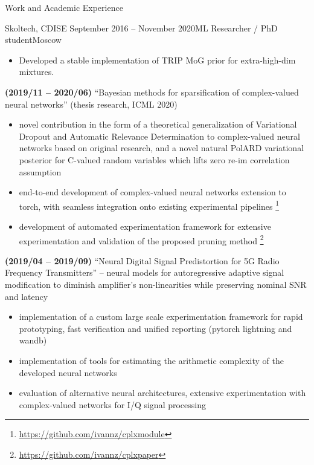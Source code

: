 \documentclass{resume} %
\begin{document}
\begin{rSection}{Work and Academic Experience}
\begin{rSubsection}{
        Skoltech, CDISE
    }{September 2016 -- November 2020}{ML Researcher / PhD student}{Moscow}
\begin{itemize}
        \item Developed a stable implementation of TRIP MoG prior for extra-high-dim mixtures.
    \end{itemize}

    \item \textbf{(2019/11 -- 2020/06)}
    ``Bayesian methods for sparsification of complex-valued neural networks'' (thesis research, ICML 2020)
    \begin{itemize}
        \item novel contribution in the form of a theoretical generalization of Variational Dropout and Automatic Relevance Determination to complex-valued neural networks based on original research, and a novel natural PolARD variational posterior for C-valued random variables which lifts zero re-im correlation assumption

        \item end-to-end development of complex-valued neural networks extension to torch, with seamless integration onto existing experimental pipelines%
        \footnote{
            \url{https://github.com/ivannz/cplxmodule}
        }

        \item development of automated experimentation framework for extensive experimentation and validation of the proposed pruning method%
        \footnote{
            \url{https://github.com/ivannz/cplxpaper}
        }
    \end{itemize}

    \item \textbf{(2019/04 -- 2019/09)}
    ``Neural Digital Signal Predistortion for 5G Radio Frequency Transmitters'' -- neural models for autoregressive adaptive signal modification to diminish amplifier's non-linearities while preserving nominal SNR and latency
    \begin{itemize}
        \item implementation of a custom large scale experimentation framework for rapid prototyping, fast verification and unified reporting (pytorch lightning and wandb)

        \item implementation of tools for estimating the arithmetic complexity of the developed neural networks

        \item evaluation of alternative neural architectures, extensive experimentation with complex-valued networks for I/Q signal processing
    \end{itemize}


\end{rSubsection}
\end{rSection}
\end{document}
